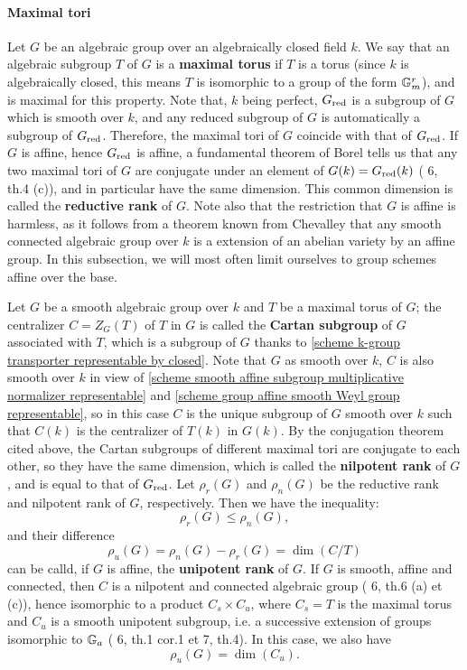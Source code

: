 \paragraph{Maximal tori}
Let $G$ be an algebraic group over an algebraically closed field $k$. We say that an algebraic subgroup $T$ of $G$ is a \textbf{maximal torus} if $T$ is a torus (since $k$ is algebraically closed, this means $T$ is isomorphic to a group of the form $\mathbb{G}_m^r$), and is maximal for this property. Note that, $k$ being perfect, $G_{\mathrm{red}}$ is a subgroup of $G$ which is smooth over $k$, and any reduced subgroup of $G$ is automatically a subgroup of $G_{\mathrm{red}}$. Therefore, the maximal tori of $G$ coincide with that of $G_{\mathrm{red}}$. If $G$ is affine, hence $G_{\mathrm{red}}$ is affine, a fundamental theorem of Borel tells us that any two maximal tori of $G$ are conjugate under an element of $G(k)=G_{\mathrm{red}}(k)$ (\cite{Chevalley1958} 6, th.4 (c)), and in particular have the same dimension. This common dimension is called the \textbf{reductive rank} of $G$. Note also that the restriction that $G$ is affine is harmless, as it follows from a theorem known from Chevalley that any smooth connected algebraic group over $k$ is a extension of an abelian variety by an affine group. In this subsection, we will most often limit ourselves to group schemes affine over the base.\par
Let $G$ be a smooth algebraic group over $k$ and $T$ be a maximal torus of $G$; the centralizer $C=Z_G(T)$ of $T$ in $G$ is called the \textbf{Cartan subgroup} of $G$ associated with $T$, which is a subgroup of $G$ thanks to \cref{scheme k-group transporter representable by closed}. Note that $G$ as smooth over $k$, $C$ is also smooth over $k$ in view of \cref{scheme smooth affine subgroup multiplicative normalizer representable} and \cref{scheme group affine smooth Weyl group representable}, so in this case $C$ is the unique subgroup of $G$ smooth over $k$ such that $C(k)$ is the centralizer of $T(k)$ in $G(k)$. By the conjugation theorem cited above, the Cartan subgroups of different maximal tori are conjugate to each other, so they have the same dimension, which is called the \textbf{nilpotent rank} of $G$, and is equal to that of $G_{\mathrm{red}}$. Let $\rho_r(G)$ and $\rho_n(G)$ be the reductive rank and nilpotent rank of $G$, respectively. Then we have the inequality:
\[\rho_r(G)\leq\rho_n(G),\]
and their difference
\[\rho_u(G)=\rho_n(G)-\rho_r(G)=\dim(C/T)\]
can be calld, if $G$ is affine, the \textbf{unipotent rank} of $G$. If $G$ is smooth, affine and connected, then $C$ is a nilpotent and connected algebraic group (\cite{Chevalley1958} 6, th.6 (a) et (c)), hence isomorphic to a product $C_s\times C_u$, where $C_s=T$ is the maximal torus and $C_u$ is a smooth unipotent subgroup, i.e. a successive extension of groups isomorphic to $\mathbb{G}_a$ (\cite{Chevalley1958} 6, th.1 cor.1 et 7, th.4). In this case, we also have
\[\rho_u(G)=\dim(C_u).\]

